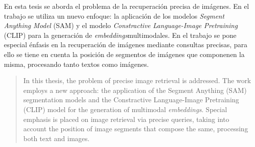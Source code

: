 \begin{resumen}
	En esta tesis se aborda el problema de la recuperación precisa de imágenes. En el trabajo se utiliza un nuevo enfoque: la aplicación de los modelos \textit{Segment Anything Model} (SAM) y el  modelo \textit{Constractive Language-Image Pretraining} (CLIP) para la generación de \textit{embeddings}multimodales. En el trabajo se pone especial énfasis en la recuperación de  imágenes mediante consultas precisas, para ello se tiene en cuenta la posición de segmentos de imágenes que componenen la misma, procesando tanto textos como imágenes.
	\end{resumen}
	
	\begin{abstract}
		In this thesis, the problem of precise image retrieval is addressed. The work employs a new approach: the application of the Segment Anything (SAM) segmentation models and the Constractive Language-Image Pretraining (CLIP) model for the generation of multimodal \textit{embeddings}. Special emphasis is placed on image retrieval via precise queries, taking into account the position of image segments that compose the same, processing both text and images.
	\end{abstract}